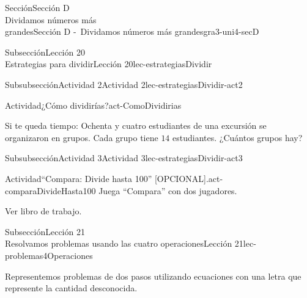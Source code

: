 \begin{sectionptx}{Sección}{{\Large Sección D\\}Dividamos números más\\grandes}{}{Sección D -~Dividamos números más grandes}{}{}{gra3-uni4-secD}
\begin{subsectionptx}{Subsección}{{\normalsize Lección 20\\[-0.05cm]}Estrategias para dividir}{}{Lección 20}{}{}{lec-estrategiasDividir}
\begin{subsubsectionptx}{Subsubsección}{Actividad 2}{}{Actividad 2}{}{}{lec-estrategiasDividir-act2}
\begin{activity}{Actividad}{¿Cómo dividirías?}{act-ComoDividirias}
\begin{enumerate}
\end{enumerate}
Si te queda tiempo: Ochenta y cuatro estudiantes de una excursión se organizaron en grupos. Cada grupo tiene \(14\) estudiantes. ¿Cuántos grupos hay?%
\end{activity}%
\end{subsubsectionptx}
%
%
\typeout{************************************************}
\typeout{************************************************}
%
\begin{subsubsectionptx}{Subsubsección}{Actividad 3}{}{Actividad 3}{}{}{lec-estrategiasDividir-act3}
\begin{activity}{Actividad}{“Compara: Divide hasta 100” [OPCIONAL].}{act-comparaDivideHasta100}%
Juega ``Compara'' con dos jugadores.%
\par
Ver libro de trabajo.
\end{activity}%
\end{subsubsectionptx}
%
%
\end{subsectionptx}
%
%
\typeout{************************************************}
\typeout{************************************************}
%
\begin{subsectionptx}{Subsección}{{\normalsize Lección 21\\[-0.05cm]}Resolvamos problemas usando las cuatro operaciones}{}{Lección 21}{}{}{lec-problemas4Operaciones}
\begin{introduction}{}%
Representemos problemas de dos pasos utilizando ecuaciones con una letra que represente la cantidad desconocida.%
\end{introduction}%
%
%
\typeout{************************************************}
\typeout{************************************************}

\end{subsectionptx}
\end{sectionptx}
